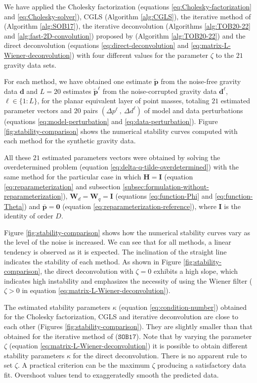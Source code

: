We have applied the Cholesky factorization (equations \ref{eq:Cholesky-factorization} and \ref{eq:Cholesky-solver}), 
CGLS (Algorithm \ref{alg:CGLS}), the iterative method of \citet{siqueira-etal2017} (Algorithm \ref{alg:SOB17}), 
the iterative deconvolution (Algorithms \ref{alg:TOB20-22} and \ref{alg:fast-2D-convolution}) proposed by 
\citet{takahashi-etal2020} (Algorithm \ref{alg:TOB20-22}) and the direct deconvolution 
(equations \ref{eq:direct-deconvolution} and \ref{eq:matrix-L-Wiener-deconvolution})
with four different values for the parameter $\zeta$ to the $21$ gravity data sets.

For each method, we have obtained one estimate $\tilde{\mathbf{p}}$ from the noise-free gravity data $\mathbf{d}$
and $L=20$ estimates $\tilde{\mathbf{p}}^{\ell}$ from the noise-corrupted gravity data $\mathbf{d}^{\ell}$, $\ell \in \{1:L\}$,
for the planar equivalent layer of point masses, totaling $21$ estimated parameter vectors and 
$20$ pairs $\left( \Delta p^{\ell} \: , \: \Delta d^{\ell} \right)$ of model and data perturbations
(equations \ref{eq:model-perturbation} and \ref{eq:data-perturbation}).
Figure \ref{fig:stability-comparison} shows the numerical stability curves computed with each method for 
the synthetic gravity data.

All these $21$ estimated parameters vectors were obtained by solving 
the overdetermined problem (equation \ref{eq:delta-q-tilde-overdetermined}) with the same method for the particular case in which
$\mathbf{H} = \mathbf{I}$ (equation \ref{eq:reparameterization} and 
subsection \ref{subsec:formulation-without-reparameterization}),
$\mathbf{W}_{d} = \mathbf{W}_{q} = \mathbf{I}$ (equations \ref{eq:function-Phi} and \ref{eq:function-Theta}) and
$\bar{\mathbf{p}} = \mathbf{0}$ (equation \ref{eq:reparameterization-reference}), where $\mathbf{I}$ is the identity of order $D$.

Figure \ref{fig:stability-comparison} shows how the numerical stability curves vary as the level of the noise is increased. 
We can see that for all methods, a linear tendency is observed as it is expected. The inclination of the straight line indicates the stability of each method. 
As shown in Figure \ref{fig:stability-comparison}, the direct deconvolution with $\zeta = 0$ exhibits a high slope, which indicates high instability and 
emphasizes the necessity of using the Wiener filter ($\zeta > 0$ in equation \ref{eq:matrix-L-Wiener-deconvolution}). 

The estimated stability parameters $\kappa$ (equation \ref{eq:condition-number}) obtained for the Cholesky factorization, CGLS and
iterative deconvolution are close to each other (Figures \ref{fig:stability-comparison}).
They are slightly smaller than that obtained for the iterative method of \citet{siqueira-etal2017} ($\mathtt{SOB17}$).
Note that by varying the parameter $\zeta$ (equation \ref{eq:matrix-L-Wiener-deconvolution}) it is possible to obtain different 
stability parameters $\kappa$ for the direct deconvolution. There is no apparent rule to set $\zeta$.
A practical criterion can be the maximum $\zeta$ producing a satisfactory data fit. Overshoot values tend to exaggeratedly smooth the 
predicted data. 

